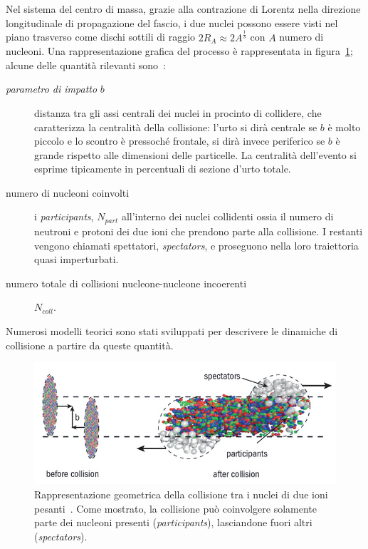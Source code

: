        Nel sistema del centro di massa, grazie alla contrazione di Lorentz nella direzione longitudinale di propagazione del fascio, i due nuclei possono essere visti nel piano trasverso come dischi sottili di raggio $2 R_A \approx 2 A^{\frac{1}{3}}$ con $A$ numero di nucleoni. Una rappresentazione grafica del processo è rappresentata in figura~\ref{fig:4-centrality}; alcune delle quantità rilevanti sono~\cite{Salgado_2009}:
        \begin{description}
            \item[\textit{parametro di impatto} $b$] distanza tra gli assi centrali dei nuclei in procinto di collidere, che caratterizza la centralità della collisione: l'urto si dirà centrale se $b$ è molto piccolo e lo scontro è pressoché frontale, si dirà invece periferico se $b$ è grande rispetto alle dimensioni delle particelle. La centralità dell'evento si esprime tipicamente in percentuali di sezione d'urto totale.
            
            \item[numero di nucleoni coinvolti] i \textit{participants}, $N_{part}$ all'interno dei nuclei collidenti ossia il numero di neutroni e protoni dei due ioni che prendono parte alla collisione. I restanti vengono chiamati spettatori, \textit{spectators}, e proseguono nella loro traiettoria quasi imperturbati. 
            
            \item[numero totale di collisioni nucleone-nucleone incoerenti] $N_{coll}$.
        \end{description}
        Numerosi modelli teorici sono stati sviluppati per descrivere le dinamiche di collisione a partire da queste quantità.

        \begin{figure}[t]
            \centering
            \includegraphics[width=1\linewidth]{res/fig/1-chapter/4-centrality.png}
            \caption{Rappresentazione geometrica della collisione tra i nuclei di due ioni pesanti~\cite{Toia_2013}. Come mostrato, la collisione può coinvolgere solamente parte dei nucleoni presenti (\textit{participants}), lasciandone fuori altri (\textit{spectators}).}
            \label{fig:4-centrality}
        \end{figure}

